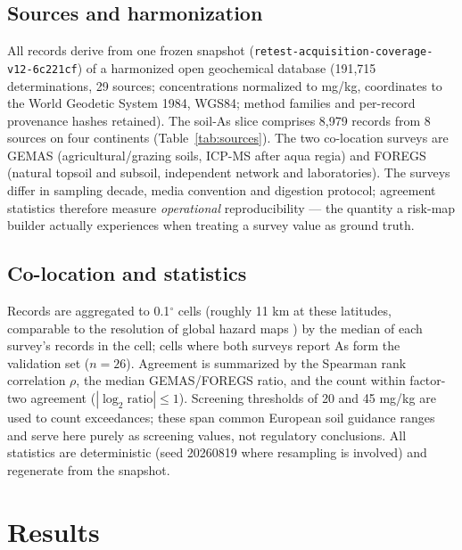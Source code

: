 \documentclass[11pt]{article}
\begin{document}
\subsection{Sources and harmonization}
All records derive from one frozen snapshot
(\texttt{retest-acquisition-coverage-v12-6c221cf}) of a harmonized open
geochemical database (191,715 determinations, 29 sources; concentrations
normalized to mg/kg, coordinates to the World Geodetic System 1984, WGS84;
method families and per-record provenance hashes retained). The soil-As
slice comprises 8,979 records from 8 sources on four continents
(Table~\ref{tab:sources}). The two co-location surveys are GEMAS
\cite{reimann2014} (agricultural/grazing soils, ICP-MS after aqua regia)
and FOREGS \cite{salminen2005,devos2006} (natural topsoil and subsoil,
independent network and laboratories). The surveys differ in sampling
decade, media convention and digestion protocol; agreement statistics
therefore measure \emph{operational} reproducibility --- the quantity a
risk-map builder actually experiences when treating a survey value as
ground truth.

\subsection{Co-location and statistics}
Records are aggregated to 0.1$^{\circ}$ cells (roughly 11 km at these
latitudes, comparable to the resolution of global hazard maps
\cite{podgorski2020}) by the median of each survey's records in the cell;
cells where both surveys report As form the validation set ($n{=}26$).
Agreement is summarized by the Spearman rank correlation $\rho$, the median
GEMAS/FOREGS ratio, and the count within factor-two agreement
($|\log_2 \mathrm{ratio}| \le 1$). Screening thresholds of 20 and 45 mg/kg
are used to count exceedances; these span common European soil guidance
ranges and serve here purely as screening values, not regulatory
conclusions. All statistics are deterministic (seed 20260819 where
resampling is involved) and regenerate from the snapshot.

\section{Results}
\end{document}
